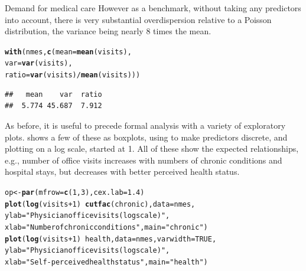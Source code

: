 \documentclass[11pt]{book}\usepackage[]{graphicx}\usepackage[]{color}
\makeatletter
\newcommand{\hlnum}[1]{\textcolor[rgb]{0.686,0.059,0.569}{#1}}%
\newcommand{\hlstr}[1]{\textcolor[rgb]{0.192,0.494,0.8}{#1}}%
\newcommand{\hlopt}[1]{\textcolor[rgb]{0,0,0}{#1}}%
\newcommand{\hlstd}[1]{\textcolor[rgb]{0.345,0.345,0.345}{#1}}%
\newcommand{\hlkwb}[1]{\textcolor[rgb]{0.69,0.353,0.396}{#1}}%
\newcommand{\hlkwc}[1]{\textcolor[rgb]{0.333,0.667,0.333}{#1}}%
\newcommand{\hlkwd}[1]{\textcolor[rgb]{0.737,0.353,0.396}{\textbf{#1}}}%
\newenvironment{kframe}{%
 \def\at@end@of@kframe{}%
 \ifinner\ifhmode%
  \def\at@end@of@kframe{\end{minipage}}%
  \begin{minipage}{\columnwidth}%
 \fi\fi%
 \def\FrameCommand##1{\hskip\@totalleftmargin \hskip-\fboxsep
 \colorbox{shadecolor}{##1}\hskip-\fboxsep
     \hskip-\linewidth \hskip-\@totalleftmargin \hskip\columnwidth}%
 \MakeFramed {\advance\hsize-\width
   \@totalleftmargin\z@ \linewidth\hsize
   \@setminipage}}%
 {\par\unskip\endMakeFramed%
 \at@end@of@kframe}
\newenvironment{knitrout}{}{} %
\renewenvironment{knitrout}{\small\renewcommand{\baselinestretch}{.85}}{} %
\makeatother
\begin{document}
\begin{Example}[nmes1]{Demand for medical care}
\begin{knitrout}
\end{knitrout}
However as a benchmark, without taking any predictors into account, there is very substantial
overdispersion relative to a Poisson distribution, the variance being nearly 8 times the mean.
\begin{knitrout}
\color{fgcolor}\begin{kframe}
\begin{alltt}
\hlkwd{with}\hlstd{(nmes,}  \hlkwd{c}\hlstd{(}\hlkwc{mean}\hlstd{=}\hlkwd{mean}\hlstd{(visits),}
              \hlkwc{var}\hlstd{=}\hlkwd{var}\hlstd{(visits),}
              \hlkwc{ratio}\hlstd{=}\hlkwd{var}\hlstd{(visits)}\hlopt{/}\hlkwd{mean}\hlstd{(visits)))}
\end{alltt}
\begin{verbatim}
##   mean    var  ratio 
##  5.774 45.687  7.912
\end{verbatim}
\end{kframe}
\end{knitrout}
As before, it is useful to precede formal analysis with a variety of exploratory plots.
 shows a few of these as boxplots, using  to make
predictors discrete, and plotting  on a log scale, started at 1.
All of these show the expected relationships, e.g., number of office
visits increases with numbers of chronic conditions and hospital stays,
but decreases with better perceived health status.
\begin{knitrout}
\color{fgcolor}\begin{kframe}
\begin{alltt}
\hlstd{op} \hlkwb{<-}\hlkwd{par}\hlstd{(}\hlkwc{mfrow}\hlstd{=}\hlkwd{c}\hlstd{(}\hlnum{1}\hlstd{,} \hlnum{3}\hlstd{),} \hlkwc{cex.lab}\hlstd{=}\hlnum{1.4}\hlstd{)}
\hlkwd{plot}\hlstd{(}\hlkwd{log}\hlstd{(visits}\hlopt{+}\hlnum{1}\hlstd{)} \hlopt{~} \hlkwd{cutfac}\hlstd{(chronic),} \hlkwc{data} \hlstd{= nmes,}
     \hlkwc{ylab} \hlstd{=} \hlstr{"Physician office visits (log scale)"}\hlstd{,}
     \hlkwc{xlab} \hlstd{=} \hlstr{"Number of chronic conditions"}\hlstd{,} \hlkwc{main} \hlstd{=} \hlstr{"chronic"}\hlstd{)}
\hlkwd{plot}\hlstd{(}\hlkwd{log}\hlstd{(visits}\hlopt{+}\hlnum{1}\hlstd{)} \hlopt{~} \hlstd{health,} \hlkwc{data} \hlstd{= nmes,} \hlkwc{varwidth} \hlstd{=} \hlnum{TRUE}\hlstd{,}
     \hlkwc{ylab} \hlstd{=} \hlstr{"Physician office visits (log scale)"}\hlstd{,}
     \hlkwc{xlab} \hlstd{=} \hlstr{"Self-perceived health status"}\hlstd{,} \hlkwc{main} \hlstd{=} \hlstr{"health"}\hlstd{)}

\end{alltt}
\end{kframe}
\end{knitrout}
\end{Example}
\end{document}
